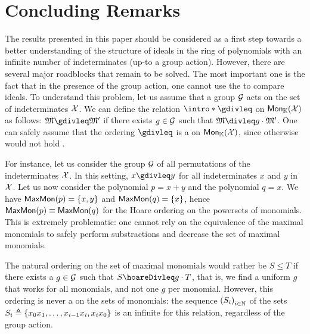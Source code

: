 \section{Concluding Remarks}
\label{sec:conclusion}

\AP The results presented in this paper should be considered as a first step
towards a better understanding of the structure of ideals in the ring of
polynomials with an infinite number of indeterminates (up-to a group action).
However, there are several major roadblocks that remain to be solved. The most
important one is the fact that in the presence of the group action, one cannot
use the  to compare ideals. To understand this
problem, let us assume that a group $\mathcal{G}$ acts on the set of indeterminates
$\mathcal{X}$. We can define the  relation
$\intro*\gdivleq$ on $\Mon{\Indets}$ as follows: $\mon[M] \gdivleq \mon[M']$ if
there exists $g \in \mathcal{G}$ such that $\mon[M] \divleq g \cdot \mon[M']$. One can
safely assume that the ordering $\gdivleq$ is a  on
$\Mon{\Indets}$, since otherwise  would not hold
\cite{GHOLAS24}.

For instance, let us consider the group $\mathcal{G}$ of all permutations of the
indeterminates $\mathcal{X}$. In this setting, $x \gdivleq y$ for all
indeterminates $x$ and $y$ in $\mathcal{X}$. Let us now consider the polynomial $p
= x + y$ and the polynomial $q = x$. We have $\mathsf{MaxMon}(p) = \{ x, y \}$ and
$\mathsf{MaxMon}(q) = \{ x \}$, hence $\mathsf{MaxMon}(p) \equiv \mathsf{MaxMon}(q)$ for the Hoare
ordering on the powersets of monomials. This is extremely problematic: one
cannot rely on the equivalence of the maximal monomials to safely perform
substractions and decrease the set of maximal monomials.

The natural ordering on the set of maximal monomials would rather be $S \leq T$
if there exists a $g \in \mathcal{G}$ such that $S \hoareDivleq g \cdot T$, that is,
we find a uniform $g$ that works for all monomials, and not one $g$ per
monomial. However, this ordering is never a  on the sets
of monomials: the sequence $\seqof{S_i}[i \in \Nat]$ of the sets $S_i \triangleq
\{  x_0 x_1, \ldots, x_{i-1} x_i, x_i x_0  \}$ is an infinite 
for this relation, regardless of the group action.
